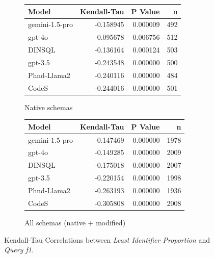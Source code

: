 \begin{figure}
  \centering
  \begin{subfigure}{.5\linewidth}
      \centering
      \begin{tabular}{lrrr}
\toprule
Model & Kendall-Tau & P Value & n \\
\midrule
gemini-1.5-pro & -0.158945 & 0.000009 & 492 \\
gpt-4o & -0.095678 & 0.006756 & 512 \\
DINSQL & -0.136164 & 0.000124 & 503 \\
gpt-3.5 & -0.243548 & 0.000000 & 500 \\
Phnd-Llama2 & -0.240116 & 0.000000 & 484 \\
CodeS & -0.244016 & 0.000000 & 501 \\
\bottomrule
\end{tabular}

      \caption{Native schemas}
      \label{table:natlow-f1-ktau-native}
  \end{subfigure}%
  \begin{subfigure}{.5\linewidth}
      \centering
      \begin{tabular}{lrrr}
\toprule
Model & Kendall-Tau & P Value & n \\
\midrule
gemini-1.5-pro & -0.147469 & 0.000000 & 1978 \\
gpt-4o & -0.149285 & 0.000000 & 2009 \\
DINSQL & -0.175018 & 0.000000 & 2007 \\
gpt-3.5 & -0.220154 & 0.000000 & 1998 \\
Phnd-Llama2 & -0.263193 & 0.000000 & 1936 \\
CodeS & -0.305808 & 0.000000 & 2008 \\
\bottomrule
\end{tabular}

      \caption{All schemas (native + modified)}
      \label{table:natlow-f1-ktau-all}
  \end{subfigure}
  \caption{Kendall-Tau Correlations between \emph{Least Identifier Proportion} and \emph{Query f1}.}
\end{figure}


